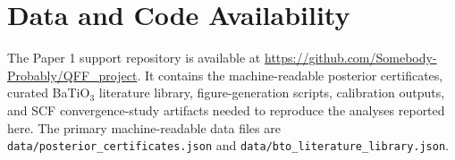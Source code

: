\documentclass[prb,twocolumn,superscriptaddress,amsmath,amssymb,longbibliography]{revtex4-2}
\begin{document}
\section*{Data and Code Availability}

The Paper 1 support repository is available at
\url{https://github.com/Somebody-Probably/QFF_project}. It contains the
machine-readable posterior certificates, curated BaTiO$_3$ literature library,
figure-generation scripts, calibration outputs, and SCF convergence-study
artifacts needed to reproduce the analyses reported here. The primary
machine-readable data files are
\texttt{data/posterior\_certificates.json} and
\texttt{data/bto\_literature\_library.json}.


\end{document}
